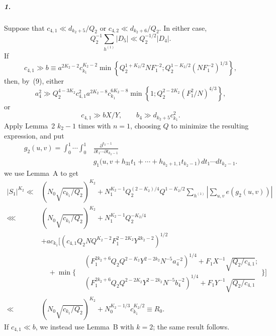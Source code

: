 \documentclass[10pt]{article}
\begin{document}
\subparagraph{1.}
Suppose that $c_{4,1}\ll d_{k_2+5}/Q_2$ or $c_{4,2}\ll d_{k_2+6}/Q_2$. In either case,
\[
  Q_2^{-1}\sum_{h^{(1)}}|D_5|\ll Q_2^{-1/2}|D_4|.
\]
If
\[
  c_{4,1}\gg b\equiv
  a^{2K_2-2}c_{k_1}^{K_2-2}
  \min\left\{
    Q_2^{1+K_2/2}NF_1^{-2};
    Q_2^{1-K_2/2}(NF_1^{-2})^{1/3}
  \right\},
\]
then, by~(9), either
\[
  a_4^2\gg
  Q_2^{4-3K_2}c_{4,1}^2a^{2K_2-8}c_{k_1}^{6K_2-8}
  \min\left\{1;
    Q_2^{2-2K_2}(F_1^2/N)^{4/3}
  \right\},
\]
or
\[
  c_{4,1}\gg bX/Y,
  \qquad b_4\gg d_{k_2+5}c_{k_1}^2.
\]
Apply Lemma~2 $k_2-1$ times with $n=1$, choosing $Q$ to minimize the resulting expression, and put
\[
\begin{aligned}
  g_2(u,v)=\int_0^1\!\cdots\!\int_0^1
  &\frac{\partial^{k_2-1}}{\partial t_1\cdots\partial t_{k_2-1}}\\
  &g_1\bigl(u,v+h_{31}t_1+\cdots+h_{k_2+1,1}t_{k_2-1}\bigr)
  \,dt_1\cdots dt_{k_2-1}.
\end{aligned}
\]
we use Lemma~A to get
\[
\begin{aligned}
  |S_1|^{K_2}
  \ll{}&\left(N_0\sqrt{c_{k_1}/Q_2}\right)^{K_2}
  +N_1^{K_2-1}Q_2^{(2-K_2)/4}Q^{1-K_2/2}
  \sum_{h^{(1)}}\left|\sum_{u,v}e(g_2(u,v))\right|\\
  \lll{}&\left(N_0\sqrt{c_{k_1}/Q_2}\right)^{K_2}
  +N_1^{K_2-1}Q_2^{-K_2/4}\\
  &+ac_{k_1}\Bigg[
    \left(c_{4,1}Q_2NQ^{K_2-2}F_1^{2-2K_2}Y^{2k_2-2}\right)^{1/2}\\
  &\quad+\min\Bigg\{
    \begin{aligned}
      &\left(F_1^{2k_2+6}Q_2Q^{2-K_2}Y^{2-2k_2}N^{-5}a_4^{-2}\right)^{1/4}
       +F_1X^{-1}\sqrt{Q_2/c_{4,1}};\\
      &\left(F_1^{2k_2+6}Q_2Q^{2-2K_2}Y^{2-2k_2}N^{-5}b_4^{-2}\right)^{1/4}
       +F_1Y^{-1}\sqrt{Q_2/c_{4,1}}
    \end{aligned}
    \Bigg\}\Bigg]\\
  \ll{}&\left(N_0\sqrt{c_{k_1}/Q_2}\right)^{K_2}
    +N_0^{K_2-1/3}c_{k_1}^{K_2/2}
    \equiv R_0.
\end{aligned}
\]
If $c_{4,1}\ll b$, we instead use Lemma~B with $k=2$; the same result follows.
\end{document}
